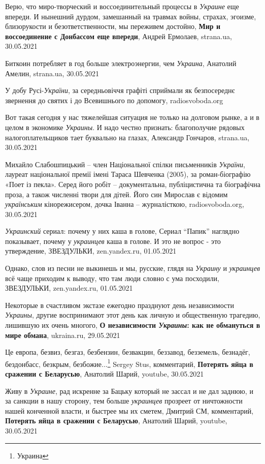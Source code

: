 Верю, что миро-творческий и воссоединительный процессы в \emph{Украине} еще
впереди. И нынешний дурдом, замешанный на травмах войны, страхах, эгоизме,
близорукости и безответственности, мы переживем достойно, \textbf{Мир и
воссоединение с Донбассом еще впереди}, Андрей Ермолаев, strana.ua, 30.05.2021

Биткоин потребляет в год больше электроэнергии, чем \emph{Украина}, Анатолий
Амелин, strana.ua, 30.05.2021

У добу Русі-\emph{України}, за середньовіччя графіті сприймали як безпосереднє
звернення до святих і до Всевишнього по допомогу, radiosvoboda.org

Вот такая сегодня у нас тяжелейшая ситуация не только на долговом рынке, а и в
целом в экономике \emph{Украины}. И надо честно признать: благополучие рядовых
налогоплательщиков тает буквально на глазах, Александр Гончаров, strana.ua,
30.05.2021

Михайло Слабошпицький – член Національної спілки письменників \emph{України},
лауреат національної премії імені Тараса Шевченка (2005), за роман-біографію
«Поет із пекла». Серед його робіт – документальна, публіцистична та біографічна
проза, а також численні твори для дітей. Його син Мирослав є відомим
\emph{українським} кінорежисером, дочка Іванна – журналісткою,
radiosvoboda.org, 30.05.2021

\emph{Украинский} сериал: почему у них каша в голове, Сериал \enquote{Папик}
наглядно показывает, почему у \emph{украинцев} каша в голове. И это не вопрос -
это утверждение, ЗВЕЗДУЛЬКИ, zen.yandex.ru, 01.05.2021

Однако, слов из песни не выкинешь и мы, русские, глядя на \emph{Украину} и
\emph{украинцев} всё чаще приходим к выводу, что там люди словно с ума
посходили, ЗВЕЗДУЛЬКИ, zen.yandex.ru, 01.05.2021

Некоторые в счастливом экстазе ежегодно празднуют день независимости
\emph{Украины}, другие воспринимают этот день как личную и общественную
трагедию, лишившую их очень многого, \textbf{О независимости \emph{Украины}:
как не обмануться в мире обмана}, ukraina.ru, 29.05.2021

Це европа, безвиз, безгаз, безбензин, безвакцин, беззавод, безземель, безнадёг,
бездонбасс, безкрым, безбожие...\footnote{Украина} Sergey Stus, комментарий,
\textbf{Потерять яйца в сражении с Беларусью}, Анатолий Шарий, youtube,
30.05.2021 

Живу в \emph{Украине}, рад искренне за Бацьку который не зассал и не дал
заднюю, и за санкции в нашу сторону, тем больше \emph{украинцев} прозреет от
ничтожности нашей конченной власти, и быстрее мы их сметем, Дмитрий СМ,
комментарий, \textbf{Потерять яйца в сражении с Беларусью}, Анатолий Шарий,
youtube, 30.05.2021

